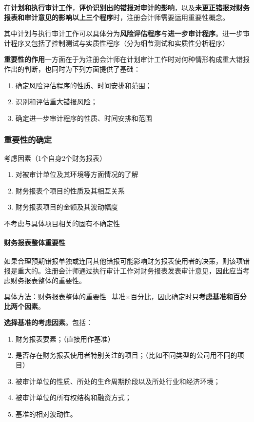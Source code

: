 \documentclass[UTF8,12pt]{ctexart}
\numberwithin{equation}{section} %
\numberwithin{figure}{section}
\numberwithin{table}{section}
\begin{document}
	
	在\textbf{计划和执行审计工作}，\textbf{评价识别出的错报对审计的影响}，以及\textbf{未更正错报对财务报表和审计意见的影响}\textbf{以上三个程序}时，注册会计师需要运用重要性概念。
	
	其中计划与执行审计工作可以具体分为\textbf{风险评估程序}与\textbf{进一步审计程序}。进一步审计程序又包括了控制测试与实质性程序（分为细节测试和实质性分析程序）
	
	\textbf{重要性的作用}一方面在于为注册会计师在计划审计工作时对何种情形构成重大错报作出的判断，也同时为下列方面提供了基础：
	\begin{enumerate}
		\item 确定风险评估程序的性质、时间安排和范围；
	
		\item 识别和评估重大错报风险；
	
		\item 确定进一步审计程序的性质、时间安排和范围
	\end{enumerate}
	
	\subsubsection{重要性的确定}
	考虑因素（1个自身2个财务报表）
	\begin{enumerate}
		\item 对被审计单位及其环境等方面情况的了解
		
		\item 财务报表个项目的性质及其相互关系
		
		\item 财务报表项目的金额及其波动幅度
	\end{enumerate}
	
	不考虑与具体项目相关的固有不确定性
	
	\paragraph{财务报表整体重要性}
	如果合理预期错报单独或连同其他错报可能影响财务报表使用者的决策，则该项错报是重大的。注册会计师通过执行审计工作对财务报表发表审计意见，因此应当考虑财务报表整体的重要性。

	具体方法：财务报表整体的重要性=基准×百分比，因此确定时只\textbf{考虑基准和百分比两个因素}。
	
	\textbf{选择基准的考虑因素}。包括：
	\begin{enumerate}
		\item 财务报表要素；（直接用作基准）
		
		\item 是否存在财务报表使用者特别关注的项目；（比如不同类型的公司用不同的项目）
		
		\item 被审计单位的性质、所处的生命周期阶段以及所处行业和经济环境；
		
		\item 被审计单位的所有权结构和融资方式；
		
		\item 基准的相对波动性。
	\end{enumerate}
	
\end{document}
